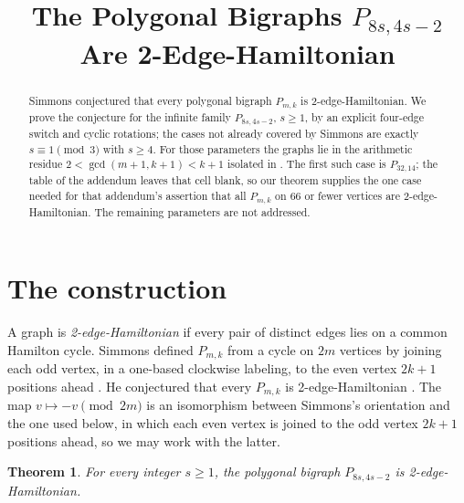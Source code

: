 \documentclass[11pt]{amsart}
\title[The polygonal bigraphs $P_{8s,4s-2}$]
{The Polygonal Bigraphs $P_{8s,4s-2}$ Are 2-Edge-Hamiltonian}
\date{}
\newtheorem{theorem}{Theorem}
\begin{document}
\begin{abstract}
Simmons conjectured that every polygonal bigraph $P_{m,k}$ is
2-edge-Hamiltonian. We prove the conjecture for the infinite family
$P_{8s,4s-2}$, $s\geq 1$, by an explicit four-edge switch and cyclic
rotations; the cases not already covered by Simmons are exactly
$s\equiv 1\pmod 3$ with $s\geq 4$. For those
parameters the graphs lie in the arithmetic residue
$2<\gcd(m+1,k+1)<k+1$ isolated in \cite[p.~109]{Simmons2020}. The first
such case is $P_{32,14}$; the table of the addendum \cite{Simmons2020a}
leaves that cell blank, so our theorem supplies the one case needed for
that addendum's assertion that all $P_{m,k}$ on $66$ or fewer vertices
are 2-edge-Hamiltonian. The remaining parameters are not addressed.
\end{abstract}

\maketitle

\section{The construction}

A graph is \emph{2-edge-Hamiltonian} if every pair of distinct edges lies
on a common Hamilton cycle. Simmons defined $P_{m,k}$ from a cycle on
$2m$ vertices by joining each odd vertex, in a one-based clockwise
labeling, to the even vertex $2k+1$ positions ahead
\cite[pp.~101--102]{Simmons2020}. He conjectured that every $P_{m,k}$ is
2-edge-Hamiltonian \cite[p.~101]{Simmons2020}. The map $v\mapsto
-v\pmod{2m}$ is an isomorphism between Simmons's orientation and the one
used below, in which each even vertex is joined to the odd vertex $2k+1$
positions ahead, so we may work with the latter.

\begin{theorem}\label{thm:main}
For every integer $s\geq 1$, the polygonal bigraph $P_{8s,4s-2}$ is
2-edge-Hamiltonian.
\end{theorem}
\end{document}
